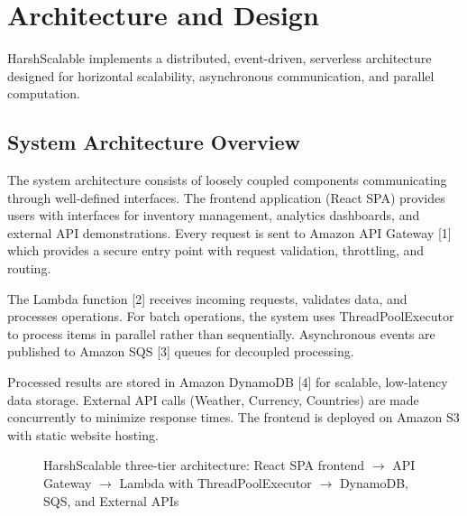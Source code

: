 \documentclass[conference]{IEEEtran}
\begin{document}
\section{Architecture and Design}
\label{sec:architecture}

HarshScalable implements a distributed, event-driven, serverless architecture designed for horizontal scalability, asynchronous communication, and parallel computation.

\subsection{System Architecture Overview}

The system architecture consists of loosely coupled components communicating through well-defined interfaces. The frontend application (React SPA) provides users with interfaces for inventory management, analytics dashboards, and external API demonstrations. Every request is sent to Amazon API Gateway [1] which provides a secure entry point with request validation, throttling, and routing.

The Lambda function [2] receives incoming requests, validates data, and processes operations. For batch operations, the system uses ThreadPoolExecutor to process items in parallel rather than sequentially. Asynchronous events are published to Amazon SQS [3] queues for decoupled processing.

Processed results are stored in Amazon DynamoDB [4] for scalable, low-latency data storage. External API calls (Weather, Currency, Countries) are made concurrently to minimize response times. The frontend is deployed on Amazon S3 with static website hosting.

\begin{figure}[!t]
\centering
{}
\caption{HarshScalable three-tier architecture: React SPA frontend $\rightarrow$ API Gateway $\rightarrow$ Lambda with ThreadPoolExecutor $\rightarrow$ DynamoDB, SQS, and External APIs}
\label{fig:architecture}
\end{figure}
\end{document}
